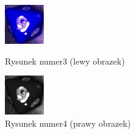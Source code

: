 \begin{figure}[H]
    \centering
    \begin{minipage}[t]{0.45\linewidth}
        \centering
        \includegraphics[width=\linewidth]{chapters/04-czytanie/figures/blask_raw}
        \caption{Rysunek numer3 (lewy obrazek)}
        \label{fig:blaskraw}
    \end{minipage}
    \hfill
    \begin{minipage}[t]{0.45\linewidth}
        \centering
        \includegraphics[width=\linewidth]{chapters/04-czytanie/figures/blask_proc}
        \caption{Rysunek numer4 (prawy obrazek)}
        \label{fig:blaskproc}
    \end{minipage}
\end{figure}




